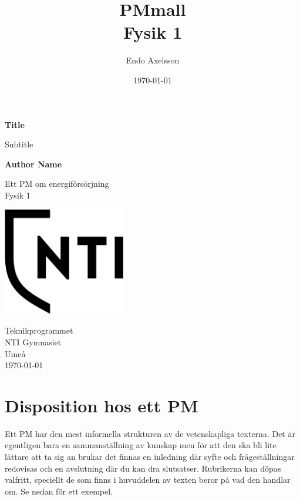 \documentclass[11p]{article}
\title{PMmall \\ \small Fysik 1}
\author{Endo Axelsson }
\date{\today}
\begin{document}
    \begin{titlepage}
        \begin{center}
            \vspace*{1cm}

            \Huge
            \textbf{Title}

            \vspace{0.5cm}
            \LARGE
            Subtitle

            \vspace{1.5cm}

            \textbf{Author Name}

            \vfill

            Ett PM om energiförsörjning \\
            Fysik 1

            \vspace{0.8cm}

            \includegraphics[width=0.4\textwidth]{../images/NTI Gymnasiet_Symbol_print_svart.png}

            \Large
            Teknikprogrammet\\
            NTI Gymnasiet\\
            Umeå\\
            \today

        \end{center}
    \end{titlepage}
    \tableofcontents
    \newpage
    \section{Disposition hos ett PM}
    Ett PM har den mest informella strukturen av de vetenskapliga texterna. Det är egentligen bara en sammanställning av kunskap men för att den ska bli lite lättare att ta sig an brukar det finnas en inledning där syfte och frågeställningar redovisas och en avslutning där du kan dra slutsatser. Rubrikerna kan döpas valfritt, speciellt de som finns i huvuddelen av texten beror på vad den handlar om. Se nedan för ett exempel.
\end{document}
